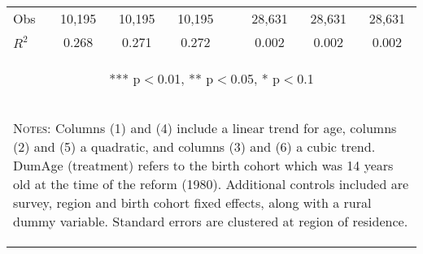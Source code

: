 \begin{subtables}
\begin{landscape}
\begin{table}[htpb!]
\begin{center}
\begin{tabular}{lcccp{0.3cm}ccc}
Obs	&	10,195	&	10,195	&	10,195	&&	28,631	&	28,631	&	28,631	\\	
$R^2$	&	0.268	&	0.271	&	0.272	&&	0.002	&	0.002	&	0.002	\\ \midrule	
\multicolumn{8}{c}{\begin{footnotesize} *** p$<$0.01, ** p$<$0.05, * p$<$0.1\end{footnotesize}} \\														
\multicolumn{8}{p{16cm}}{\begin{footnotesize}\textsc{Notes:} Columns (1) and (4) include a linear trend for age, columns (2) and (5) a quadratic, and columns (3) and (6) a cubic trend.  DumAge (treatment) refers to the birth cohort which was 14 years old at the time of the reform (1980).  Additional controls included are survey, region and birth cohort fixed effects, along with a rural dummy variable. Standard errors are clustered at region of residence. \end{footnotesize}}\\														
\bottomrule														
\end{tabular}														
\end{center}														
\end{table}														
\end{landscape}														


\end{subtables}
